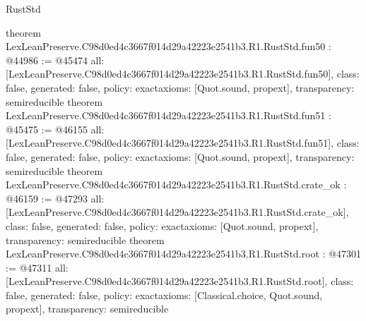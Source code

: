 \begin{lexlean}{RustStd}
\begin{coremodule}
{}
theorem LexLeanPreserve.C98d0ed4c3667f014d29a42223e2541b3.R1.RustStd.fun50 : @44986 := @45474 {
  all: [LexLeanPreserve.C98d0ed4c3667f014d29a42223e2541b3.R1.RustStd.fun50],
  class: false,
  generated: false,
  policy: exact{axioms: [Quot.sound, propext]},
  transparency: semireducible
}
theorem LexLeanPreserve.C98d0ed4c3667f014d29a42223e2541b3.R1.RustStd.fun51 : @45475 := @46155 {
  all: [LexLeanPreserve.C98d0ed4c3667f014d29a42223e2541b3.R1.RustStd.fun51],
  class: false,
  generated: false,
  policy: exact{axioms: [Quot.sound, propext]},
  transparency: semireducible
}
theorem LexLeanPreserve.C98d0ed4c3667f014d29a42223e2541b3.R1.RustStd.crate_ok : @46159 := @47293 {
  all: [LexLeanPreserve.C98d0ed4c3667f014d29a42223e2541b3.R1.RustStd.crate_ok],
  class: false,
  generated: false,
  policy: exact{axioms: [Quot.sound, propext]},
  transparency: semireducible
}
theorem LexLeanPreserve.C98d0ed4c3667f014d29a42223e2541b3.R1.RustStd.root : @47301 := @47311 {
  all: [LexLeanPreserve.C98d0ed4c3667f014d29a42223e2541b3.R1.RustStd.root],
  class: false,
  generated: false,
  policy: exact{axioms: [Classical.choice, Quot.sound, propext]},
  transparency: semireducible
}


\end{coremodule}
\end{lexlean}
